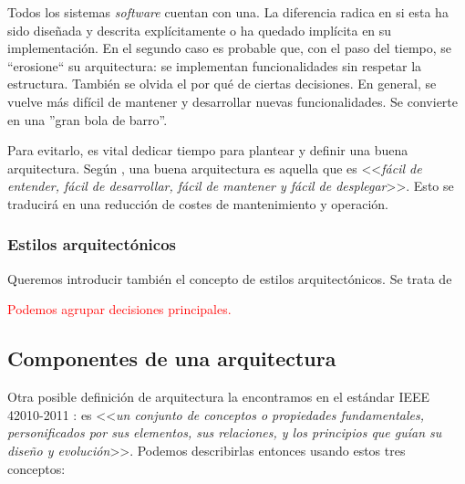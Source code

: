 Todos los sistemas \emph{software} cuentan con una. La diferencia radica en si esta ha sido diseñada y descrita explícitamente o ha quedado implícita en su implementación. \cite{taylorSoftwareArchitectureFoundations2009} En el segundo caso es probable que, con el paso del tiempo, se ``erosione`` su arquitectura: se implementan funcionalidades sin respetar la estructura. También se olvida el por qué de ciertas decisiones. En general, se vuelve más difícil de mantener y desarrollar nuevas funcionalidades. Se convierte en una ''gran bola de barro''. \cite{footeBigBallMud1997}

Para evitarlo, es vital dedicar tiempo para plantear y definir una buena arquitectura. Según \cite{martinChapter15What2018}, una buena arquitectura es aquella que es <<\emph{fácil de entender, fácil de desarrollar, fácil de mantener y fácil de desplegar}>>. Esto se traducirá en una reducción de costes de mantenimiento y operación.

\subsubsection{Estilos arquitectónicos}

Queremos introducir también el concepto de estilos arquitectónicos. Se trata de

\textcolor{red}{Podemos agrupar decisiones principales.}

\subsection{Componentes de una arquitectura}

Otra posible definición de arquitectura la encontramos en el estándar IEEE 42010-2011 \cite{ieeeStandard420102011Systems2011}: es <<\emph{un conjunto de conceptos o propiedades fundamentales, personificados por sus elementos, sus relaciones, y los principios que guían su diseño y evolución}>>. Podemos describirlas entonces usando estos tres conceptos: \cite{perryFoundationsStudySoftware1992}

